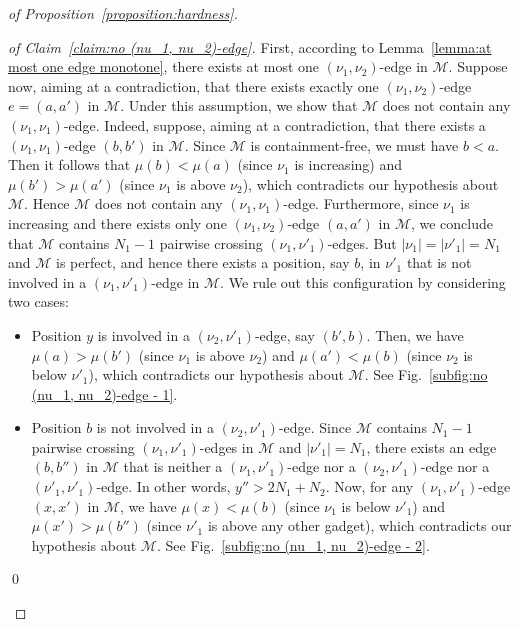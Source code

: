 \begin{proof}[of Proposition~\ref{proposition:hardness}]
  \begin{proof}[of Claim~\ref{claim:no (nu_1, nu_2)-edge}]
    First, according to Lemma~\ref{lemma:at most one edge monotone},
    there exists at most one $(\nu_1, \nu_2)$-edge in $\mathcal{M}$.
    Suppose now, aiming at a contradiction, that there exists
    exactly one $(\nu_1, \nu_2)$-edge $e = (a, a')$ in $\mathcal{M}$.
    Under this assumption, we show that $\mathcal{M}$ does not contain any $(\nu_1, \nu_1)$-edge.
    Indeed, suppose, aiming at a contradiction,
    that there exists a $(\nu_1, \nu_1)$-edge $(b, b')$ in $\mathcal{M}$.
    Since $\mathcal{M}$ is containment-free,
    we must have $b < a$.
    Then it follows that $\mu(b) < \mu(a)$ (since $\nu_1$ is increasing) and
    $\mu(b') > \mu(a')$ (since $\nu_1$ is above $\nu_2$),
    which contradicts our hypothesis about $\mathcal{M}$.
    Hence $\mathcal{M}$ does not contain any $(\nu_1, \nu_1)$-edge.
    Furthermore, since $\nu_1$ is increasing and
    there exists only one $(\nu_1, \nu_2)$-edge $(a, a')$ in $\mathcal{M}$,
    we conclude that
    $\mathcal{M}$ contains $N_1-1$ pairwise crossing $(\nu_1, \nu'_1)$-edges.
    But $|\nu_1| = |\nu'_1| = N_1$ and $\mathcal{M}$ is perfect,
    and hence there exists a position, say $b$, in $\nu'_1$ that is
    not involved in a $(\nu_1, \nu'_1)$-edge in $\mathcal{M}$.
    We rule out this configuration by considering two cases:
    \begin{itemize}
      \item Position $y$ is involved in a $(\nu_2, \nu'_1)$-edge,
      say $(b', b)$.
      Then, we have $\mu(a) > \mu(b')$ (since $\nu_1$ is above $\nu_2$)
      and $\mu(a') < \mu(b)$ (since $\nu_2$ is below $\nu'_1$),
      which contradicts our hypothesis about $\mathcal{M}$.
      See Fig.~\ref{subfig:no (nu_1, nu_2)-edge - 1}.
      \item Position $b$ is not involved in a $(\nu_2, \nu'_1)$-edge.
      Since $\mathcal{M}$ contains $N_1-1$ pairwise crossing $(\nu_1, \nu'_1)$-edges
      in $\mathcal{M}$ and $|\nu'_1| = N_1$, there exists an edge
      $(b, b'')$ in $\mathcal{M}$
      that is neither a $(\nu_1, \nu'_1)$-edge nor a $(\nu_2, \nu'_1)$-edge
      nor a $(\nu'_1, \nu'_1)$-edge.
      In other words, $y'' > 2N_1 + N_2$.
      Now, for any $(\nu_1, \nu'_1)$-edge $(x, x')$ in $\mathcal{M}$, we
      have $\mu(x) < \mu(b)$ (since $\nu_1$ is below $\nu'_1$)
      and $\mu(x') > \mu(b'')$ (since $\nu'_1$ is above any other gadget),
      which contradicts our hypothesis about $\mathcal{M}$.
      See Fig.~\ref{subfig:no (nu_1, nu_2)-edge - 2}.
    \end{itemize}
    \qed
  \end{proof}


\end{proof}
